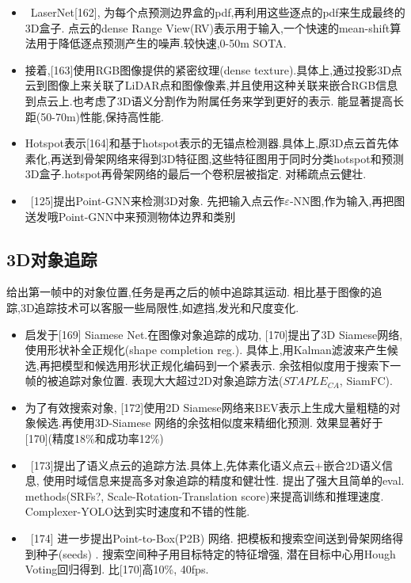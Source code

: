 \documentclass{article}
\begin{document}
\begin{itemize}
    \item \ LaserNet[162], 为每个点预测边界盒的pdf,再利用这些逐点的pdf来生成最终的3D盒子. 点云的dense Range View(RV)表示用于输入,一个快速的mean-shift算法用于降低逐点预测产生的噪声.较快速,0-50m SOTA.
    \item 接着,[163]使用RGB图像提供的紧密纹理(dense texture).具体上,通过投影3D点云到图像上来关联了LiDAR点和图像像素,并且使用这种关联来嵌合RGB信息到点云上.也考虑了3D语义分割作为附属任务来学到更好的表示. 能显著提高长距(50-70m)性能,保持高性能.
    \item Hotspot表示[164]和基于hotspot表示的无锚点检测器.具体上,原3D点云首先体素化,再送到骨架网络来得到3D特征图,这些特征图用于同时分类hotspot和预测3D盒子.hotspot再骨架网络的最后一个卷积层被指定. 对稀疏点云健壮.
    \item \ [125]提出Point-GNN来检测3D对象. 先把输入点云作$\varepsilon$-NN图,作为输入,再把图送发哦Point-GNN中来预测物体边界和类别
\end{itemize}

\subsection{3D对象追踪}

给出第一帧中的对象位置,任务是再之后的帧中追踪其运动. 相比基于图像的追踪,3D追踪技术可以客服一些局限性,如遮挡,发光和尺度变化.

\begin{itemize}
    \item 启发于[169] Siamese Net.在图像对象追踪的成功, [170]提出了3D Siamese网络,使用形状补全正规化(shape completion reg.). 具体上,用Kalman滤波来产生候选,再把模型和候选用形状正规化编码到一个紧表示. 余弦相似度用于搜索下一帧的被追踪对象位置. 表现大大超过2D对象追踪方法($STAPLE_{CA}$, SiamFC).
    \item 为了有效搜索对象, [172]使用2D Siamese网络来BEV表示上生成大量粗糙的对象候选.再使用3D-Siamese 网络的余弦相似度来精细化预测. 效果显著好于[170](精度18\%和成功率12\%)
    \item \ [173]提出了语义点云的追踪方法.具体上,先体素化语义点云+嵌合2D语义信息, 使用时域信息来提高多对象追踪的精度和健壮性. 提出了强大且简单的eval. methods(SRFs?, Scale-Rotation-Translation score)来提高训练和推理速度. Complexer-YOLO达到实时速度和不错的性能.
    \item \ [174] 进一步提出Point-to-Box(P2B) 网络. 把模板和搜索空间送到骨架网络得到种子(seeds) . 搜索空间种子用目标特定的特征增强, 潜在目标中心用Hough Voting回归得到. 比[170]高10\%, 40fps.
\end{itemize}
\end{document}
